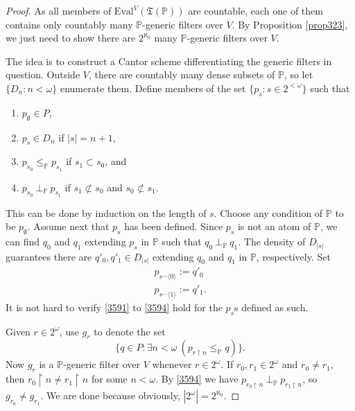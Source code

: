 \documentclass[12pt, twoside]{memoir}
\numberwithin{equation}{section}
\theoremstyle{definition}
\theoremstyle{remark}
\theoremstyle{definition}
\theoremstyle{definition}
\theoremstyle{definition}
\theoremstyle{remark}
\begin{document}
\begin{proof}
As all members of $\mathrm{Eval}^V(\mathfrak{T}(\mathbb{P}))$ are countable, each one of them contains only countably many $\mathbb{P}$-generic filters over $V$. By Proposition \ref{prop323}, we just need to show there are $2^{\aleph_0}$ many $\mathbb{P}$-generic filters over $V$. 

The idea is to construct a Cantor scheme differentiating the generic filters in question. Outside $V$, there are countably many dense subsets of $\mathbb{P}$, so let $\{D_n : n < \omega\}$ enumerate them. Define members of the set $\{p_s : s \in 2^{< \omega}\}$ such that
\begin{enumerate}[label=(\arabic*)]
    \item\label{3591} $p_{\emptyset} \in P$,
    \item $p_s \in D_n$ if $|s| = n + 1$,
    \item $p_{s_0} \leq_{\mathbb{P}} p_{s_1}$ if $s_1 \subset s_0$, and
    \item\label{3594} $p_{s_0} \ \bot_{\mathbb{P}} \ p_{s_1}$ if $s_1 \not\subset s_0$ and $s_0 \not\subset s_1$.
\end{enumerate}
This can be done by induction on the length of $s$. Choose any condition of $\mathbb{P}$ to be $p_{\emptyset}$. Assume next that $p_s$ has been defined. Since $p_s$ is not an atom of $\mathbb{P}$, we can find $q_0$ and $q_1$ extending $p_s$ in $\mathbb{P}$ such that $q_0 \ \bot_{\mathbb{P}} \ q_1$. The density of $D_{|s|}$ guarantees there are $q'_0, q'_1 \in D_{|s|}$ extending $q_0$ and $q_1$ in $\mathbb{P}$, respectively. Set
\begin{gather*}
    p_{s^\frown \langle 0 \rangle} := q'_0 \\
    p_{s^\frown \langle 1 \rangle} := q'_1 \text{.}
\end{gather*}
It is not hard to verify \ref{3591} to \ref{3594} hold for the $p_s$s defined as such.

Given $r \in 2^{\omega}$, use $g_r$ to denote the set
\begin{equation*}
    \{q \in P : \exists n < \omega \ (p_{r \restriction n} \leq_{\mathbb{P}} q)\} \text{.}
\end{equation*}
Now $g_r$ is a $\mathbb{P}$-generic filter over $V$ whenever $r \in 2^{\omega}$. If $r_0, r_1 \in 2^{\omega}$ and $r_0 \neq r_1$, then $r_0 \restriction n \neq r_1 \restriction n$ for some $n < \omega$. By \ref{3594} we have $p_{r_0 \restriction n} \ \bot_{\mathbb{P}} \ p_{r_1 \restriction n}$, so $g_{r_0} \neq g_{r_1}$. We are done because obviously, $|2^{\omega}| = 2^{\aleph_0}$.
\end{proof}
\end{document}
